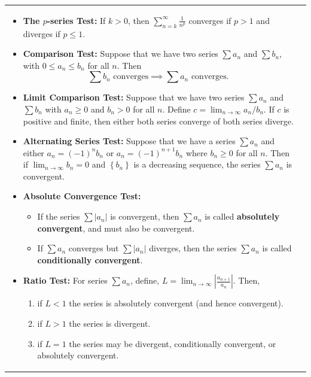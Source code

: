 \documentclass{article}
\newenvironment{bx}[1][]{
\begin{tcolorbox}[colback=white!97!black, title=#1, arc=0in, halign=flush left, left=1mm, right=1mm,]
}{
\end{tcolorbox}
}
\begin{document}
\begin{tabular}{p{263pt} p{280pt}}
\begin{bx}[Test for Convergence and Divergence]
\begin{itemize}[leftmargin=1em]
\item \textbf{The $p$-series Test:}
 If $k>0$, then $\sum_{n=k}^\infty\frac{1}{n^p}$ converges if $p>1$ and diverges if $p\leq 1$.


\item \textbf{Comparison Test:}
 Suppose that we have two series $\sum a_n$ and $\sum b_n$, with $0\leq a_n\leq b_n$ for all $n$. Then
 $$\sum b_n\text{ converges}\implies \sum a_n\text{ converges}.$$


\item \textbf{Limit Comparison Test:}
Suppose that we have two series $\sum a_n$ and $\sum b_n$ with $a_n\geq 0$ and $b_n > 0$ for all $n$. Define $c=\lim_{n\to\infty}{a_n}/{b_n}.$ If $c$ is positive and finite, then either both series converge of both series diverge.


\item \textbf{Alternating Series Test:}
Suppose that we have a series $\sum a_{n}$ and either $a_{n}=(-1)^{n} b_{n}$ or $a_{n}=(-1)^{n+1} b_{n}$ where $b_{n} \geq 0$ for all $n .$ Then if ${\displaystyle\lim _{n \to \infty}} b_{n}=0$ and $\left\{b_{n}\right\}$ is a decreasing sequence, the series $\sum a_{n}$ is convergent.


\item \textbf{Absolute Convergence Test:}
\phantom{}
\begin{itemize}[leftmargin=1em]
    \item If the series $\sum |a_n|$ is convergent, then $\sum a_n$ is called \textbf{absolutely convergent}, and must also be convergent.
    \item If $\sum a_n$ converges but $\sum |a_n|$ diverges, then the series $\sum a_n$ is called \textbf{conditionally convergent}.
\end{itemize}


\item \textbf{Ratio Test:}
For series $\sum a_{n}$, define, $ L={\displaystyle\lim _{n \to \infty}} \left|\frac{a_{n+1}}{a_{n}}\right|.$ Then,
\begin{enumerate}[leftmargin=1em]
    \item if $L<1$ the series is absolutely convergent (and hence convergent).
    \item if $L>1$ the series is divergent.
    \item  if $L=1$ the series may be divergent, conditionally convergent, or absolutely convergent.
\end{enumerate}


\end{itemize}
\end{bx}
\end{tabular}
\end{document}
